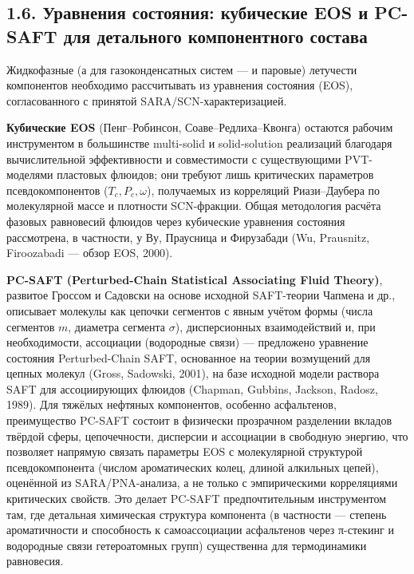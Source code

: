 \documentclass[11pt]{extarticle}
\begin{document}
\subsection{1.6. Уравнения состояния: кубические EOS и PC-SAFT для детального компонентного состава}\label{ux443ux440ux430ux432ux43dux435ux43dux438ux44f-ux441ux43eux441ux442ux43eux44fux43dux438ux44f-ux43aux443ux431ux438ux447ux435ux441ux43aux438ux435-eos-ux438-pc-saft-ux434ux43bux44f-ux434ux435ux442ux430ux43bux44cux43dux43eux433ux43e-ux43aux43eux43cux43fux43eux43dux435ux43dux442ux43dux43eux433ux43e-ux441ux43eux441ux442ux430ux432ux430}

Жидкофазные (а для газоконденсатных систем --- и паровые) летучести компонентов необходимо рассчитывать из уравнения состояния (EOS), согласованного с принятой SARA/SCN-характеризацией.

\textbf{Кубические EOS} (Пенг--Робинсон, Соаве--Редлиха--Квонга) остаются рабочим инструментом в большинстве multi-solid и solid-solution реализаций благодаря вычислительной эффективности и совместимости с существующими PVT-моделями пластовых флюидов; они требуют лишь критических параметров псевдокомпонентов (\(T_c, P_c, \omega\)), получаемых из корреляций Риази--Даубера по молекулярной массе и плотности SCN-фракции. Общая методология расчёта фазовых равновесий флюидов через кубические уравнения состояния рассмотрена, в частности, у Ву, Праусница и Фирузабади (Wu, Prausnitz, Firoozabadi --- обзор EOS, 2000).

\textbf{PC-SAFT (Perturbed-Chain Statistical Associating Fluid Theory)}, развитое Гроссом и Садовски на основе исходной SAFT-теории Чапмена и др., описывает молекулы как цепочки сегментов с явным учётом формы (числа сегментов \(m\), диаметра сегмента \(\sigma\)), дисперсионных взаимодействий и, при необходимости, ассоциации (водородные связи) --- предложено уравнение состояния Perturbed-Chain SAFT, основанное на теории возмущений для цепных молекул (Gross, Sadowski, 2001), на базе исходной модели раствора SAFT для ассоциирующих флюидов (Chapman, Gubbins, Jackson, Radosz, 1989). Для тяжёлых нефтяных компонентов, особенно асфальтенов, преимущество PC-SAFT состоит в физически прозрачном разделении вкладов твёрдой сферы, цепочечности, дисперсии и ассоциации в свободную энергию, что позволяет напрямую связать параметры EOS с молекулярной структурой псевдокомпонента (числом ароматических колец, длиной алкильных цепей), оценённой из SARA/PNA-анализа, а не только с эмпирическими корреляциями критических свойств. Это делает PC-SAFT предпочтительным инструментом там, где детальная химическая структура компонента (в частности --- степень ароматичности и способность к самоассоциации асфальтенов через π-стекинг и водородные связи гетероатомных групп) существенна для термодинамики равновесия.
\end{document}

